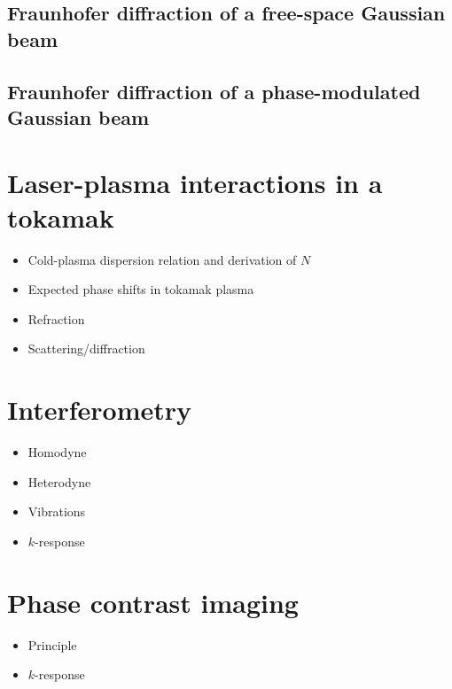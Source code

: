 \subsection{Fraunhofer diffraction of a free-space Gaussian beam}
\subsection{Fraunhofer diffraction of a phase-modulated Gaussian beam}



\section{Laser-plasma interactions in a tokamak}
\begin{itemize}
  \item Cold-plasma dispersion relation and derivation of $N$
  \item Expected phase shifts in tokamak plasma
  \item Refraction
  \item Scattering/diffraction
\end{itemize}

\section{Interferometry}
\begin{itemize}
  \item Homodyne
  \item Heterodyne
  \item Vibrations
  \item $k$-response
\end{itemize}

\section{Phase contrast imaging}
\begin{itemize}
  \item Principle
  \item $k$-response
\end{itemize}





